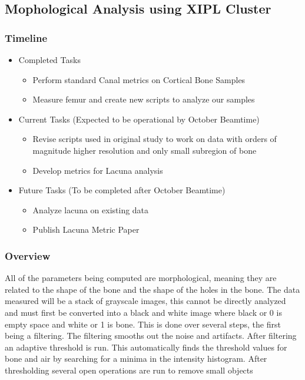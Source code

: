 \subsection{Mophological Analysis using XIPL Cluster}
\subsubsection*{Timeline}
\begin{itemize}
 	\item Completed Tasks
	\begin{itemize}
		\item Perform standard Canal metrics on Cortical Bone Samples
		\item Measure femur and create new scripts to analyze our samples
	\end{itemize}
	\item Current Tasks (Expected to be operational by October Beamtime)
	\begin{itemize}
		\item Revise scripts used in original study to work on data with orders of magnitude higher resolution and only small subregion of bone
		\item Develop metrics for Lacuna analysis
	\end{itemize}
	\item Future Tasks (To be completed after October Beamtime)
	\begin{itemize}
		\item Analyze lacuna on existing data
		\item Publish Lacuna Metric Paper
	\end{itemize}
\end{itemize}
\subsubsection*{Overview}
All of the parameters being computed are morphological, meaning they are related to the shape of the bone and the shape of the holes in the bone. The data measured will be a stack of grayscale images, this cannot be directly analyzed and must first be converted into a black and white image where black or 0 is empty space and white or 1 is bone. This is done over several steps, the first being a filtering. The filtering smooths out the noise and artifacts. After filtering an adaptive threshold is run. This automatically finds the threshold values for bone and air by searching for a minima in the intensity histogram. After thresholding several open operations are run to remove small objects
